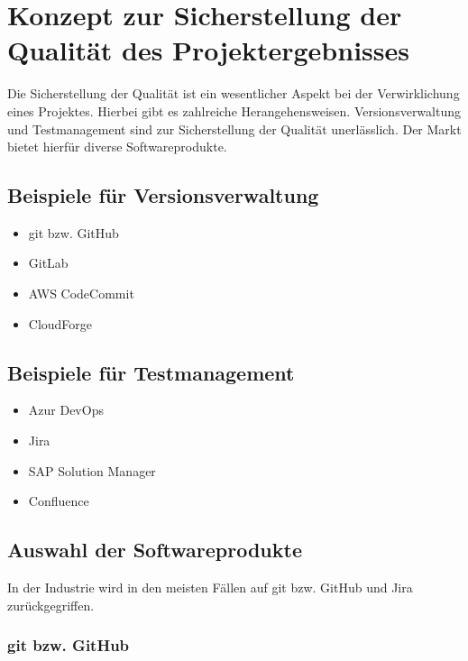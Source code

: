 \documentclass[12pt]{article}
\begin{document}
	
	\tableofcontents
	\newpage
	\thispagestyle{plain}
	
	\section{Konzept zur Sicherstellung der Qualität des Projektergebnisses}
	
	Die Sicherstellung der Qualität ist ein wesentlicher Aspekt bei der Verwirklichung eines Projektes. Hierbei gibt es zahlreiche Herangehensweisen. Versionsverwaltung und Testmanagement sind zur Sicherstellung der Qualität unerlässlich. Der Markt bietet hierfür diverse Softwareprodukte.\\
	
	\subsection{Beispiele für Versionsverwaltung}
	 \begin{itemize}
	 	\item git bzw. GitHub
	 	\item GitLab
	 	\item AWS CodeCommit
	 	\item CloudForge
	 \end{itemize}
 	
 	\subsection{Beispiele für Testmanagement}
 	
 	
 	\begin{itemize}
 		\item Azur DevOps
 		\item Jira
 		\item SAP Solution Manager
 		\item Confluence
 	\end{itemize}
 	
 	\subsection{Auswahl der Softwareprodukte}
 	
 	In der Industrie wird in den meisten Fällen auf git bzw. GitHub und Jira zurückgegriffen.
 	
 	\subsubsection{git bzw. GitHub}
 	
 	
 	
 	
 	
 	
	
\end{document}
